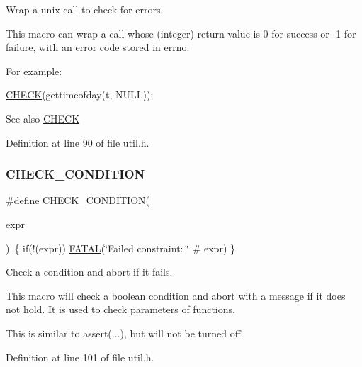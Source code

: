 Wrap a unix call to check for errors. 

This macro can wrap a call whose (integer) return value is 0 for success or -\/1 for failure, with an error code stored in errno.

For example\+: 
\begin{DoxyCode}
\hyperlink{group__check__macros_ga1992445028206dcca9c93c9a0b558436}{CHECK}(gettimeofday(t, NULL));
\end{DoxyCode}
 \begin{DoxySeeAlso}{See also}
\hyperlink{group__check__macros_ga1992445028206dcca9c93c9a0b558436}{C\+H\+E\+CK} 
\end{DoxySeeAlso}


Definition at line 90 of file util.\+h.

\mbox{\label{group__check__macros_ga6196238e8ab53ab90e7bf7ab51fc73e9}} 
\subsubsection{\texorpdfstring{C\+H\+E\+C\+K\+\_\+\+C\+O\+N\+D\+I\+T\+I\+ON}{CHECK\_CONDITION}}
{\footnotesize\ttfamily \#define C\+H\+E\+C\+K\+\_\+\+C\+O\+N\+D\+I\+T\+I\+ON(\begin{DoxyParamCaption}\item[{}]{expr }\end{DoxyParamCaption})~\{ if(!(expr)) \hyperlink{group__check__macros_ga7a3e1d362790a375466c5e77a6d5c9c5}{F\+A\+T\+AL}(\char`\"{}Failed constraint\+: \char`\"{} \# expr) \}}



Check a condition and abort if it fails. 

This macro will check a boolean condition and abort with a message if it does not hold. It is used to check parameters of functions.

This is similar to {\ttfamily assert}(...), but will not be turned off. 

Definition at line 101 of file util.\+h.

\mbox{\label{group__check__macros_ga879857ca00d32faa0d6cfe416428a804}} 
